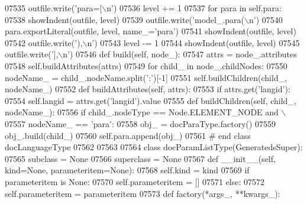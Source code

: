 \begin{DoxyCode}
{{{{{{{{{{{{{{{{{{{{{{{{{{{{{{{{{{{{{{{{{{{{{{{{{{{{{{{{{{{{{{{{{{{{{{{{{{{{{{{{{{{{{{{{{{{{{{{{{{{{{{{{{{{{{{{{{{{{{{{{{{{{{{{{{{{{{{{{{{{{{{{{{{{{{{{{{{{{{{{{{{{{{{{{{{{{{{{{{{{{{{{{{{{{{{{{{{{{{{{{{{{{{{{{{{{{{{{{{{{{{{{{{{{{{{{{{{{{{{{{{{{{{{{{{{{{{{{{{{{{{{{{{{{{{{{{{{{{{{{{{{{{{{{{{{{{{{{{{{{{{{{{{{{{{{{{{{{{{{{{{{{{{{{{{{{{{{{{{{{{{{{{{{{{{{{{{{{{{{{{{{{{{{{{{{{{{{{{{{{{{{{{{{{{{{{{{{{{{{{{{{{{{{{{{{{{{{{{{{{{{{{{{{{{{{{{{{{{{{{{{{{{{{{{{{{{{{{{{{{{{{{{{{{{{{{{{{07535         outfile.write(\textcolor{stringliteral}{'para=[\(\backslash\)n'})
07536         level += 1
07537         \textcolor{keywordflow}{for} para \textcolor{keywordflow}{in} self.para:
07538             showIndent(outfile, level)
07539             outfile.write(\textcolor{stringliteral}{'model\_.para(\(\backslash\)n'})
07540             para.exportLiteral(outfile, level, name\_=\textcolor{stringliteral}{'para'})
07541             showIndent(outfile, level)
07542             outfile.write(\textcolor{stringliteral}{'),\(\backslash\)n'})
07543         level -= 1
07544         showIndent(outfile, level)
07545         outfile.write(\textcolor{stringliteral}{'],\(\backslash\)n'})
07546     \textcolor{keyword}{def }build(self, node\_):
07547         attrs = node\_.attributes
07548         self.buildAttributes(attrs)
07549         \textcolor{keywordflow}{for} child\_ \textcolor{keywordflow}{in} node\_.childNodes:
07550             nodeName\_ = child\_.nodeName.split(\textcolor{stringliteral}{':'})[-1]
07551             self.buildChildren(child\_, nodeName\_)
07552     \textcolor{keyword}{def }buildAttributes(self, attrs):
07553         \textcolor{keywordflow}{if} attrs.get(\textcolor{stringliteral}{'langid'}):
07554             self.langid = attrs.get(\textcolor{stringliteral}{'langid'}).value
07555     \textcolor{keyword}{def }buildChildren(self, child\_, nodeName\_):
07556         \textcolor{keywordflow}{if} child\_.nodeType == Node.ELEMENT\_NODE \textcolor{keywordflow}{and} \(\backslash\)
07557             nodeName\_ == \textcolor{stringliteral}{'para'}:
07558             obj\_ = docParaType.factory()
07559             obj\_.build(child\_)
07560             self.para.append(obj\_)
07561 \textcolor{comment}{# end class docLanguageType}
07562 
07563 
07564 \textcolor{keyword}{class }docParamListType(GeneratedsSuper):
07565     subclass = \textcolor{keywordtype}{None}
07566     superclass = \textcolor{keywordtype}{None}
07567     \textcolor{keyword}{def }__init__(self, kind=None, parameteritem=None):
07568         self.kind = kind
07569         \textcolor{keywordflow}{if} parameteritem \textcolor{keywordflow}{is} \textcolor{keywordtype}{None}:
07570             self.parameteritem = []
07571         \textcolor{keywordflow}{else}:
07572             self.parameteritem = parameteritem
07573     \textcolor{keyword}{def }factory(*args\_, **kwargs\_):
}}}}}}}}}}}}}}}}}}}}}}}}}}}}}}}}}}}}}}}}}}}}}}}}}}}}}}}}}}}}}}}}}}}}}}}}}}}}}}}}}}}}}}}}}}}}}}}}}}}}}}}}}}}}}}}}}}}}}}}}}}}}}}}}}}}}}}}}}}}}}}}}}}}}}}}}}}}}}}}}}}}}}}}}}}}}}}}}}}}}}}}}}}}}}}}}}}}}}}}}}}}}}}}}}}}}}}}}}}}}}}}}}}}}}}}}}}}}}}}}}}}}}}}}}}}}}}}}}}}}}}}}}}}}}}}}}}}}}}}}}}}}}}}}}}}}}}}}}}}}}}}}}}}}}}}}}}}}}}}}}}}}}}}}}}}}}}}}}}}}}}}}}}}}}}}}}}}}}}}}}}}}}}}}}}}}}}}}}}}}}}}}}}}}}}}}}}}}}}}}}}}}}}}}}}}}}}}}}}}}}}}}}}}}}}}}}}}}}}}}}}}}}}}}}}}}}}}}}}}}}}}}}}}}}}}}}}
\end{DoxyCode}
